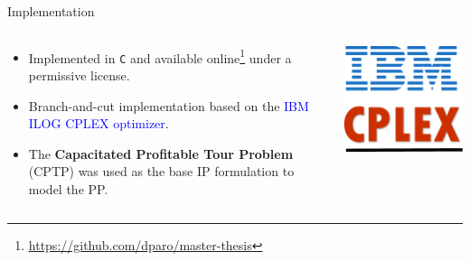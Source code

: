\begin{frame}{Implementation}
	\begin{columns}
		\begin{column}{0.85\textwidth}
			\begin{itemize}
				\item Implemented in \texttt{C} and available online\footnote[1]{\url{https://github.com/dparo/master-thesis}} under a permissive license.
				\item Branch-and-cut implementation based on the \textcolor{blue}{IBM ILOG CPLEX optimizer}.
				\item The \textbf{Capacitated Profitable Tour Problem} (CPTP) \parencite{jepsen2014} was used as the base IP formulation to model the PP.

			\end{itemize}
		\end{column}
		\begin{column}{0.15\textwidth}
			\centering
			\includegraphics[width=\textwidth]{./Imgs/IBM-ILOG-CPLEX-logo.png}
		\end{column}
	\end{columns}

	\vspace{0.2cm}


\end{frame}
